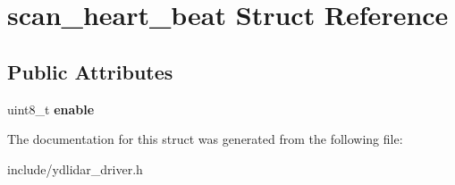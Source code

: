 \hypertarget{structscan__heart__beat}{}\section{scan\+\_\+heart\+\_\+beat Struct Reference}
\label{structscan__heart__beat}
\subsection*{Public Attributes}
\begin{DoxyCompactItemize}
\item 
uint8\+\_\+t {\bfseries enable}\hypertarget{structscan__heart__beat_a2b75f0058448601c590dda44d962d5c9}{}\label{structscan__heart__beat_a2b75f0058448601c590dda44d962d5c9}

\end{DoxyCompactItemize}


The documentation for this struct was generated from the following file\+:\begin{DoxyCompactItemize}
\item 
include/ydlidar\+\_\+driver.\+h\end{DoxyCompactItemize}
